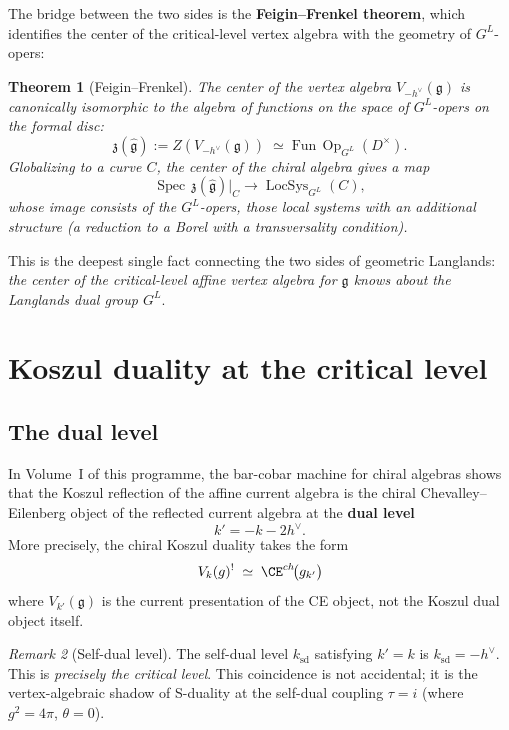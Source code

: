 \documentclass[11pt]{article}
\newtheorem{theorem}{Theorem}[section]
\theoremstyle{definition}
\theoremstyle{remark}
\newtheorem{remark}[theorem]{Remark}
\DeclareMathOperator{\LocSys}{LocSys}
\DeclareMathOperator{\Spec}{Spec}
\DeclareMathOperator{\Op}{Op}
\newcommand{\g}{\mathfrak{g}}
\newcommand{\hv}{h^\vee}
\begin{document}
The bridge between the two sides is the \textbf{Feigin--Frenkel theorem},
which identifies the center of the critical-level vertex algebra with the
geometry of $G^L$-opers:

\begin{theorem}[Feigin--Frenkel]
\label{thm:feigin-frenkel}
The center of the vertex algebra $V_{-\hv}(\g)$ is canonically isomorphic to
the algebra of functions on the space of $G^L$-opers on the formal disc:
\[
 \mathfrak{z}(\hat{\g}) := Z(V_{-\hv}(\g))
 \;\simeq\; \mathrm{Fun}\,\Op_{G^L}(D^\times).
\]
Globalizing to a curve $C$, the center of the chiral algebra gives a map
\[
 \Spec\, \mathfrak{z}(\hat{\g})|_C \longrightarrow
 \LocSys_{G^L}(C),
\]
whose image consists of the $G^L$-opers, those local systems with an
additional structure (a reduction to a Borel with a transversality condition).
\end{theorem}

This is the deepest single fact connecting the two sides of geometric Langlands:
\emph{the center of the critical-level affine vertex algebra for $\g$ knows
about the Langlands dual group $G^L$}.


\section{Koszul duality at the critical level}
\label{sec:koszul-critical}

\subsection{The dual level}

In Volume~I of this programme, the bar-cobar machine for chiral algebras
shows that the Koszul reflection of the affine current algebra is the
chiral Chevalley--Eilenberg object of the reflected current algebra at the
\textbf{dual level}
\begin{equation}\label{eq:dual-level}
 k' = -k - 2\hv.
\end{equation}
More precisely, the chiral Koszul duality takes the form
\[
 V_k(\g)^! \;\simeq\; \CE^{\mathrm{ch}}\!\bigl(\widehat{\g}_{k'}\bigr)
\]
where $V_{k'}(\g)$ is the current presentation of the CE object, not the
Koszul dual object itself.

\begin{remark}[Self-dual level]
\label{rem:self-dual}
The self-dual level $k_{\mathrm{sd}}$ satisfying $k' = k$ is $k_{\mathrm{sd}}
= -\hv$. This is \emph{precisely the critical level}. This coincidence is
not accidental; it is the vertex-algebraic shadow of S-duality at the
self-dual coupling $\tau = i$ (where $g^2 = 4\pi$, $\theta = 0$).
\end{remark}
\end{document}
